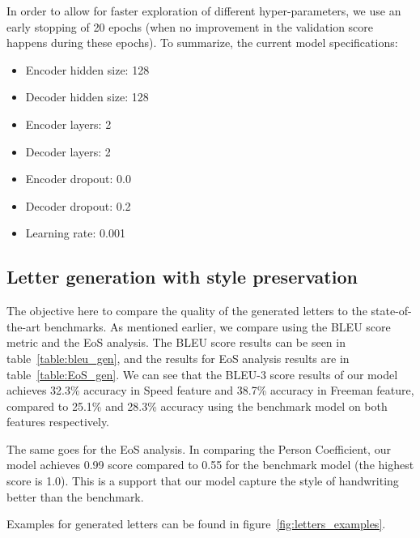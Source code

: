     \par In order to allow for faster exploration of different hyper-parameters, we use an early stopping of 20 epochs (when no improvement in the validation score happens during these epochs). To summarize, the current model specifications:
    \begin{itemize}
        \item Encoder hidden size: 128
        \item Decoder hidden size: 128
        \item Encoder layers: 2
        \item Decoder layers: 2
        \item Encoder dropout: 0.0
        \item Decoder dropout: 0.2
        \item Learning rate: 0.001
    \end{itemize}

  \subsection{Letter generation with style preservation}
  \par The objective here to compare the quality of the generated letters to the state-of-the-art benchmarks. As mentioned earlier, we compare using the BLEU score metric and the EoS analysis.
  The BLEU score results can be seen in table~\ref{table:bleu_gen}, and the results for EoS analysis results are in table~\ref{table:EoS_gen}. We can see that the BLEU-3 score results of our model achieves 32.3\% accuracy in Speed feature and 38.7\% accuracy in Freeman feature, compared to 25.1\% and 28.3\% accuracy using the benchmark model on both features respectively.
  \par The same goes for the EoS analysis. In comparing the Person Coefficient, our model achieves 0.99 score compared to 0.55 for the benchmark model (the highest score is 1.0). This is a support that our model capture the style of handwriting better than the benchmark.
  \par Examples for generated letters can be found in figure~\ref{fig:letters_examples}.



